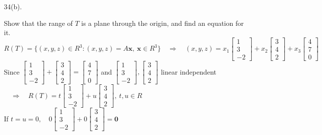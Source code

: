 \documentclass[12pt]{book}
\begin{document}
\begin{CJK}{UTF8}{bsmi}
34(b). \begin{minipage}[t]{\dimexpr\linewidth-2em}
Show that the range of $T$ is a plane through the origin, and find an equation for it. \\
$R(T)=\{(x,y,z)\in R^3:(x,y,z)=A\textbf{x},\ \textbf{x}\in R^3\}\quad\Rightarrow\quad(x,y,z)=x_1\begin{bmatrix}
1 \\ 3 \\ -2
\end{bmatrix}+x_2\begin{bmatrix}
3 \\ 4 \\ 2
\end{bmatrix}+x_3\begin{bmatrix}
4 \\ 7 \\ 0
\end{bmatrix}$ \\
Since $\begin{bmatrix}
1 \\ 3 \\ -2
\end{bmatrix}+\begin{bmatrix}
3 \\ 4 \\ 2
\end{bmatrix}=\begin{bmatrix}
4 \\ 7 \\ 0
\end{bmatrix}$ and $\begin{bmatrix}
1 \\ 3 \\ -2
\end{bmatrix},\begin{bmatrix}
3 \\ 4 \\ 2
\end{bmatrix}$ linear independent$\quad\Rightarrow\quad R(T)=t\begin{bmatrix}
1 \\ 3 \\ -2
\end{bmatrix}+u\begin{bmatrix}
3 \\ 4 \\ 2
\end{bmatrix},\ t,u\in R$ \\
If $t=u=0,\quad0\begin{bmatrix}
1 \\ 3 \\ -2
\end{bmatrix}+0\begin{bmatrix}
3 \\ 4 \\ 2
\end{bmatrix}=\textbf{0}$
\end{minipage}\\


\end{CJK}
\end{document}
